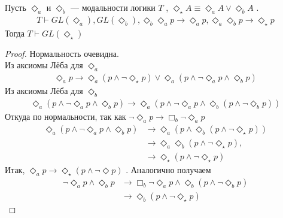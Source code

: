 \documentclass[12pt,a4paper,oneside]{article} \usepackage[left=2cm, right=2cm, top=1.3cm,
\begin{document}
  \begin{lemma}
    Пусть $\Diamond_a $ и $\Diamond_b $ --- модальности логики $T$ , $\Diamond_\star A \equiv
    \Diamond_a A \vee  \Diamond_b A$ .
    \begin{align*}
      T \vdash  GL(\Diamond_a ), GL(\Diamond_b ), \Diamond_b \Diamond_a p \rightarrow  \Diamond_a p,
      \Diamond_a \Diamond_b p \rightarrow  \Diamond_\star p
    \end{align*}
    Тогда $T \vdash  GL(\Diamond_\star )$ 
  \end{lemma}
  \begin{proof}
    Нормальность очевидна. \\ Из аксиомы Лёба для $\Diamond_a $ 
    \begin{align*}
      \Diamond_a p \rightarrow  \Diamond_a (p \wedge  \neg \Diamond_\star p) \vee  \Diamond_a (p
      \wedge  \neg \Diamond_a p \wedge  \Diamond_b p)
    \end{align*}
    Из аксиомы Лёба для $\Diamond_b $ 
    \begin{align*}
      \Diamond_a (p \wedge  \neg \Diamond_a p \wedge  \Diamond_b p) \rightarrow  \Diamond_a (p
      \wedge  \neg \Diamond_a p \wedge  \Diamond_b (p \wedge  \neg \Diamond_b p))
    \end{align*}
    Откуда по нормальности, так как $\neg \Diamond_a p \rightarrow  \Box_b \neg \Diamond_a p$ 
    \begin{align*}
      \Diamond_a (p \wedge  \neg \Diamond_a p \wedge  \Diamond_b p) &\rightarrow  \Diamond_a (p
      \wedge  \Diamond_b (p \wedge  \neg \Diamond_\star p))\\
      &\rightarrow  \Diamond_a \Diamond_b (p \wedge  \neg \Diamond_\star p),\\
      &\rightarrow  \Diamond_\star (p \wedge  \neg \Diamond_\star p)
    \end{align*}
    Итак, $\Diamond_a p \rightarrow  \Diamond_\star (p \wedge  \neg \Diamond p)$ . Аналогично
    получаем
    \begin{align*}
      \neg \Diamond_a p \wedge  \Diamond_b p &\rightarrow  \Box_b \neg \Diamond_a p \wedge 
      \Diamond_b (p \wedge  \neg \Diamond_b p)\\
      &\rightarrow  \Diamond_b (p \wedge  \neg \Diamond_\star p)
    \end{align*}
  \end{proof}
\end{document}

